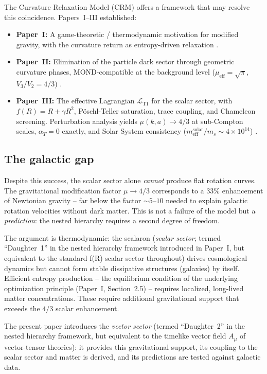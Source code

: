 \documentclass[aps,prd,twocolumn,superscriptaddress,nofootinbib]{revtex4-2}
\begin{document}
The Curvature Relaxation Model (CRM) offers a framework that may resolve this coincidence. Papers~I--III \cite{Geiger2026,Geiger2026b,Geiger2026c} established:
\begin{itemize}
\item \textbf{Paper~I:} A game-theoretic / thermodynamic motivation for modified gravity, with the curvature return as entropy-driven relaxation \cite{Geiger2026}.
\item \textbf{Paper~II:} Elimination of the particle dark sector through geometric curvature phases, MOND-compatible at the background level ($\mu_{\mathrm{eff}} = \sqrt{\pi}$, $V_3/V_2 = 4/3$) \cite{Geiger2026b}.
\item \textbf{Paper~III:} The effective Lagrangian $\mathcal{L}_{\mathrm{T1}}$ for the scalar sector, with $f(R) = R + \gamma R^2$, P\"oschl-Teller saturation, trace coupling, and Chameleon screening. Perturbation analysis yields $\mu(k,a) \to 4/3$ at sub-Compton scales, $\alpha_T = 0$ exactly, and Solar System consistency ($m_{\mathrm{eff}}^{\mathrm{solar}}/m_s \sim 4 \times 10^{14}$) \cite{Geiger2026c}.
\end{itemize}

\subsection{The galactic gap}

Despite this success, the scalar sector alone \textit{cannot} produce flat rotation curves. The gravitational modification factor $\mu \to 4/3$ corresponds to a $33\%$ enhancement of Newtonian gravity -- far below the factor $\sim 5$--$10$ needed to explain galactic rotation velocities without dark matter. This is not a failure of the model but a \textit{prediction}: the nested hierarchy requires a second degree of freedom.

The argument is thermodynamic: the scalaron (\textit{scalar sector}; termed ``Daughter~1'' in the nested hierarchy framework introduced in Paper~I, but equivalent to the standard f(R) scalar sector throughout) drives cosmological dynamics but cannot form stable dissipative structures (galaxies) by itself. Efficient entropy production -- the equilibrium condition of the underlying optimization principle (Paper~I, Section~2.5) -- requires localized, long-lived matter concentrations. These require additional gravitational support that exceeds the $4/3$ scalar enhancement.

The present paper introduces the \textit{vector sector} (termed ``Daughter~2'' in the nested hierarchy framework, but equivalent to the timelike vector field $A_\mu$ of vector-tensor theories): it provides this gravitational support, its coupling to the scalar sector and matter is derived, and its predictions are tested against galactic data.
\end{document}
